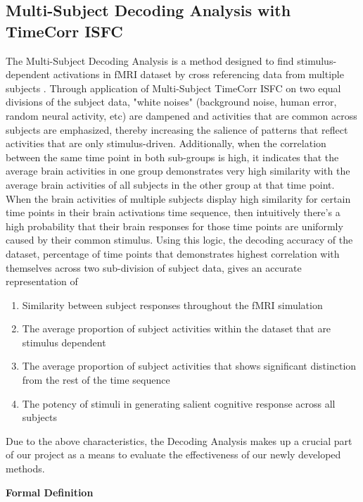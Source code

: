 \documentclass[12pt]{article}
\begin{document}
\subsection{Multi-Subject Decoding Analysis with TimeCorr ISFC}
The Multi-Subject Decoding Analysis is a method designed to find stimulus-dependent activations in fMRI dataset by cross referencing data from multiple subjects \cite{jeremy2017}. Through application of Multi-Subject TimeCorr ISFC on two equal divisions of the subject data, "white noises" (background noise, human error, random neural activity, etc) are dampened and activities that are common across subjects are emphasized, thereby increasing the salience of patterns that reflect activities that are only stimulus-driven. Additionally, when the correlation between the same time point in both sub-groups is high, it indicates that the average brain activities in one group demonstrates very high similarity with the average brain activities of all subjects in the other group at that time point. When the brain activities of multiple subjects display high similarity for certain time points in their brain activations time sequence, then intuitively there's a high probability that their brain responses for those time points are uniformly caused by their common stimulus. Using this logic, the decoding accuracy of the dataset, percentage of time points that demonstrates highest correlation with themselves across two sub-division of subject data, gives an accurate representation of

\begin{enumerate}
\item Similarity between subject responses throughout the fMRI simulation
\item The average proportion of subject activities within the dataset that are stimulus dependent
\item The average proportion of subject activities that shows significant distinction from the rest of the time sequence
\item The potency of stimuli in generating salient cognitive response across all subjects
\end{enumerate}

Due to the above characteristics, the Decoding Analysis makes up a crucial part of our project as a means to evaluate the effectiveness of our newly developed methods.

\large{\textbf{Formal Definition}}
\end{document}
